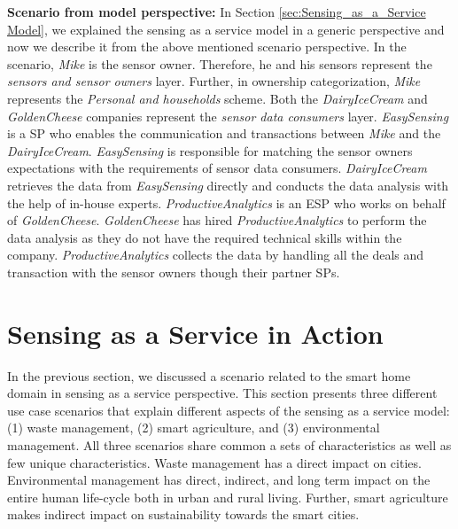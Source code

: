 \documentclass[times]{ettauth}
\begin{document}
\textbf{Scenario from model perspective:} In Section \ref{sec:Sensing_as_a_Service Model}, we explained the sensing as a service model in a generic perspective and now we describe it from the above mentioned scenario perspective. In the scenario, \textit{Mike} is the sensor owner. Therefore, he and his sensors represent the \textit{sensors and sensor owners} layer. Further, in ownership categorization, \textit{Mike} represents the \textit{Personal and households} scheme. Both the \textit{DairyIceCream} and \textit{GoldenCheese} companies represent the \textit{sensor data consumers} layer. \textit{EasySensing} is a SP who enables the communication and transactions between \textit{Mike} and the \textit{DairyIceCream}. \textit{EasySensing} is responsible for matching the sensor owners expectations  with the requirements of sensor data consumers. \textit{DairyIceCream} retrieves the data from \textit{EasySensing} directly and conducts the data analysis with the help of in-house experts. \textit{ProductiveAnalytics} is an ESP who works on behalf of \textit{GoldenCheese}. \textit{GoldenCheese} has hired \textit{ProductiveAnalytics} to perform the data analysis as they do not have the required technical skills within the company. \textit{ProductiveAnalytics} collects the data by handling all the deals and transaction with the sensor owners though their partner SPs.












\section{Sensing as a Service in Action}
\label{sec:Action}

In the previous section, we discussed a scenario related to the smart home domain in sensing as a service perspective. This section presents three different use case scenarios that explain different aspects of the sensing as a service model: (1) waste management, (2) smart agriculture, and (3) environmental management. All three scenarios share common a sets of characteristics as well as few unique characteristics. Waste management has a direct impact on cities. Environmental management has  direct, indirect, and long term impact on the entire human life-cycle both in urban and rural living. Further, smart agriculture makes indirect impact on sustainability towards the smart cities. 
\end{document}
